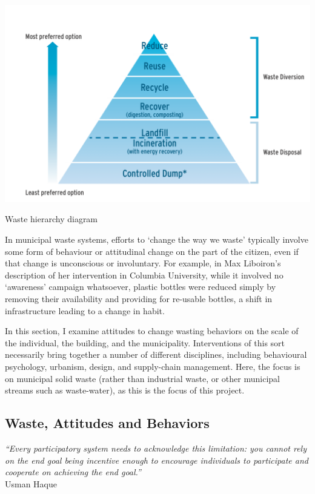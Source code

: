 \documentclass[nofonts,nols,justified,nobib]{tufte-book}
\begin{document}
\begin{marginfigure}
\includegraphics[width=\textwidth]{img/1/recycling-hierarchy.png}
\caption{Waste hierarchy diagram\label{b}}
\end{marginfigure}

In municipal waste systems, efforts to `change the way we waste' typically involve some form of behaviour or attitudinal change on the part of the citizen, even if that change is unconscious or involuntary. For example, in Max Liboiron's description of her intervention in Columbia University, while it involved no `awareness' campaign whatsoever, plastic bottles were reduced simply by removing their availability and providing for re-usable bottles, a shift in infrastructure leading to a change in habit. \cite{liboiron_against_2014}

In this section, I examine attitudes to change wasting behaviors on the scale of the individual, the building, and the municipality. Interventions of this sort necessarily bring together a number of different disciplines, including behavioural psychology, urbanism, design, and supply-chain management. Here, the focus is on municipal solid waste (rather than industrial waste, or other municipal streams such as waste-water), as this is the focus of this project.


\subsection*{Waste, Attitudes and Behaviors}

\begin{flushright}
\begin{flushright}
\emph{``Every participatory system needs to acknowledge this limitation: you cannot
 rely on the end goal being incentive enough to encourage individuals to 
participate and cooperate on achieving the end goal.''} \cite{haque_notes_2008}\\
Usman Haque
\end{flushright}
\end{flushright}
\end{document}
